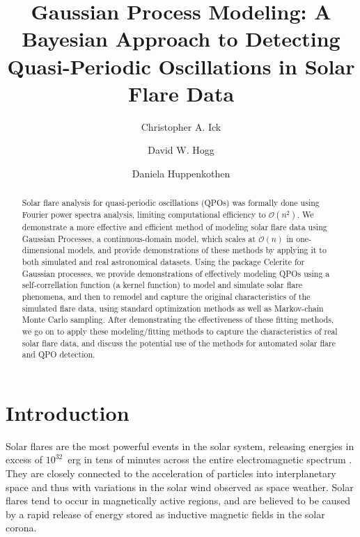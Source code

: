 \documentclass{aastex61}
\begin{document}
\title{Gaussian Process Modeling: A Bayesian Approach to Detecting Quasi-Periodic Oscillations in Solar Flare Data} \label{sec:title and authors}

\author{Christopher A. Ick}

\author{David W. Hogg}

\author{Daniela Huppenkothen}

\begin{abstract} \label{sec:abstract} 
	Solar flare analysis for quasi-periodic oscillations (QPOs)  was formally done using Fourier power spectra analysis, limiting computational efficiency to $\mathcal{O}(n^2)$.
We demonstrate a more effective and efficient method of modeling solar flare data using Gaussian Processes, a continuous-domain model, which scales at $\mathcal{O}(n)$ in one-dimensional models, and provide demonstrations of these methods by applying it to both simulated and real astronomical datasets.
Using the package Celerite for Gaussian processes, we provide demonstrations of effectively modeling QPOs using a self-correllation function (a kernel function) to model and simulate solar flare phenomena, and then to remodel and capture the original characteristics of the simulated flare data, using standard optimization methods as well as Markov-chain Monte Carlo sampling.
After demonstrating the effectiveness of these fitting methods, we go on to apply these modeling/fitting methods to capture the characteristics of real solar flare data, and discuss the potential use of the methods for automated solar flare and QPO detection.
\end{abstract}


\section{Introduction} \label{sec:intro}
Solar flares are the most powerful events in the solar system, releasing energies in excess of $10^{32}$~erg in tens of minutes across the entire electromagnetic spectrum \citep[e.g.\ ][]{fletcher2011}. 
They are closely connected to the acceleration of particles into interplanetary space and thus with variations in the solar wind observed as space weather. 
Solar flares tend to occur in magnetically active regions, and are believed to be caused by a rapid release of energy stored as inductive magnetic fields in the solar corona. 
\end{document}
